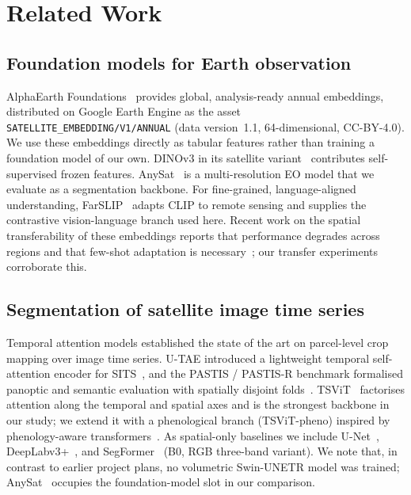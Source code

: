 \section{Related Work}
\label{sec:related}

\subsection{Foundation models for Earth observation}
AlphaEarth Foundations~\cite{brown2025alphaearth} provides global,
analysis-ready annual embeddings, distributed on Google Earth Engine as
the asset \texttt{SATELLITE\_EMBEDDING/V1/ANNUAL} (data version~1.1,
64-dimensional, CC-BY-4.0). We use these embeddings directly as tabular
features rather than training a foundation model of our own. DINOv3 in
its satellite variant~\cite{oquab2023dinov3} contributes
self-supervised frozen features. AnySat~\cite{astruc2024anysat} is a
multi-resolution EO model that we evaluate as a segmentation backbone.
For fine-grained, language-aligned understanding,
FarSLIP~\cite{li2025farslip} adapts CLIP to remote sensing and supplies
the contrastive vision-language branch used here. Recent work on the
spatial transferability of these embeddings reports that performance
degrades across regions and that few-shot adaptation is
necessary~\cite{harvesting2026alphaearth}; our transfer experiments
corroborate this.

\subsection{Segmentation of satellite image time series}
Temporal attention models established the state of the art on
parcel-level crop mapping over image time series. U-TAE introduced a
lightweight temporal self-attention encoder for
SITS~\cite{garnot2021utae}, and the PASTIS / PASTIS-R benchmark
formalised panoptic and semantic evaluation with spatially disjoint
folds~\cite{garnot2021pastis}. TSViT~\cite{tarasiou2023tsvit} factorises
attention along the temporal and spatial axes and is the strongest
backbone in our study; we extend it with a phenological branch
(TSViT-pheno) inspired by phenology-aware
transformers~\cite{wen2025phenology}. As spatial-only baselines we
include U-Net~\cite{ronneberger2015unet},
DeepLabv3+~\cite{chen2018deeplabv3plus}, and
SegFormer~\cite{xie2021segformer} (B0, RGB three-band variant). We note
that, in contrast to earlier project plans, no volumetric Swin-UNETR
model was trained; AnySat~\cite{astruc2024anysat} occupies the
foundation-model slot in our comparison.

